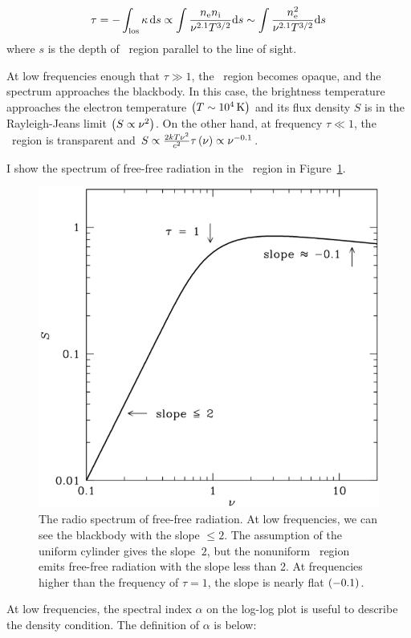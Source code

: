 \begin{equation}\label{eq:essential_radio4n53}
\tau=-\int_{\mathrm{los}} \kappa\,\mathrm{d} s \propto \int \frac{n_{\mathrm{e}} n_{\mathrm{i}}}{\nu^{2.1} T^{3/2}} \mathrm{d} s \sim \int \frac{n_{\mathrm{e}}^2}{\nu^{2.1} T^{3/2}} \mathrm{d} s
\end{equation}
where $s$ is the depth of \ih~region parallel to the line of sight.

At low frequencies enough that $\tau \gg 1$, the \ih~region becomes opaque, and the spectrum approaches the blackbody.
In this case, the brightness temperature approaches the electron temperature $\left(T\sim10^4\,\mathrm{K}\right)$ and its flux density $S$ is in the Rayleigh-Jeans limit $\left(S \propto \nu^2\right)$.
On the other hand, at frequency $\tau \ll 1$, the \ih~region is transparent and $S \propto \frac{2kT\nu^2}{c^2}\tau\left(\nu\right) \propto \nu^{-0.1}$.

I show the spectrum of free-free radiation in the \ih~region in Figure~\ref{fig:nrao_radio4n8}.

\begin{figure}[htbp]
	\centering
	\includegraphics[width=.7\linewidth]{Chapter_2/Figures/NRAO_radio4n8.png}
    \caption[The spectrum of free-free radiation]{\label{fig:nrao_radio4n8}
        The radio spectrum of free-free radiation.
        At low frequencies, we can see the blackbody with the slope $\leq 2$.
        The assumption of the uniform cylinder gives the slope $~2$, but the nonuniform \ih~region emits free-free radiation with the slope less than 2.
        At frequencies higher than the frequency of $\tau=1$, the slope is nearly flat $\left(-0.1\right)$.
    }
\end{figure}

At low frequencies, the spectral index $\alpha$ on the log-log plot is useful to describe the density condition.
The definition of $\alpha$ is below:

